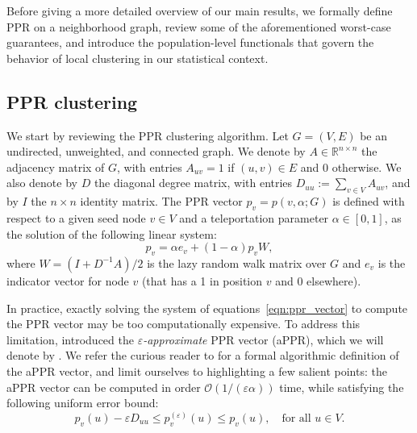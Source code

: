 \documentclass[11pt,twoside]{article}
\newcommand{\Reals}{\mathbb{R}}
\newcommand{\1}{\mathbf{1}}
\newcommand{\mc}[1]{\mathcal{#1}}
\begin{document}
Before giving a more detailed overview of our main results, we formally define PPR on a neighborhood graph, review some of the aforementioned worst-case guarantees, and introduce the population-level functionals that govern the behavior of local clustering in our statistical context. 

\subsection{PPR clustering}
\label{subsec:ppr_clustering}
We start by reviewing the PPR clustering algorithm. Let $G = (V,E)$ be an undirected, unweighted, and connected graph. We denote by $A \in \Reals^{n \times n}$ the adjacency matrix of $G$, with entries $A_{uv} = 1$ if $(u,v) \in E$ and $0$ otherwise.  We also denote by $D$ the diagonal degree matrix, with entries $D_{uu} := \sum_{v \in V} A_{uv}$, and by $I$ the $n \times n$ identity matrix. The PPR vector $p_v = p(v,\alpha;G)$ is defined with respect to a given seed node $v \in V$ and a teleportation parameter $\alpha \in [0,1]$, as the solution of the following linear system:
\begin{equation}
\label{eqn:ppr_vector}
p_v = \alpha e_{v} + (1 - \alpha) p_v W,
\end{equation}
where $W = (I + D^{-1}A)/2$ is the lazy random walk matrix over $G$ and $e_{v}$ is the indicator vector for node $v$ (that has a 1 in position $v$ and 0 elsewhere). 

In practice, exactly solving the system of equations~\eqref{eqn:ppr_vector} to compute the PPR vector may be too computationally expensive. To address this limitation, \citet{andersen2006} introduced the \emph{$\varepsilon$-approximate} PPR vector (aPPR), which we will denote by . We refer the curious reader to \citet{andersen2006} for a formal algorithmic definition of the aPPR vector, and limit ourselves to highlighting a few salient points: the aPPR vector can be computed in order $\mc{O}(1/(\varepsilon\alpha))$ time, while satisfying the following uniform error bound: 
\begin{equation}
\label{eqn:appr_error}
p_v(u) - \varepsilon D_{uu}\leq p_v^{(\varepsilon)}(u) \leq p_v(u), 
\quad \text{for all $u \in V$}.
\end{equation}
\end{document}
